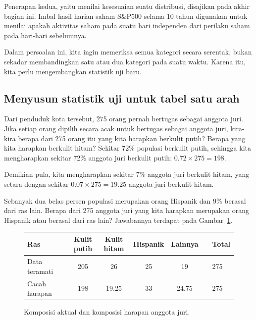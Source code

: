 Penerapan kedua, yaitu menilai kesesuaian suatu distribusi, disajikan pada akhir bagian ini. Imbal hasil harian saham S\&P500 selama 10 tahun digunakan untuk menilai apakah aktivitas saham pada suatu hari independen dari perilaku saham pada hari-hari sebelumnya.

Dalam persoalan ini, kita ingin memeriksa semua kategori secara serentak, bukan sekadar membandingkan satu atau dua kategori pada suatu waktu. Karena itu, kita perlu mengembangkan statistik uji baru.


\subsection{Menyusun statistik uji untuk tabel satu arah}

\begin{examplewrap}
\begin{nexample}{Dari penduduk kota tersebut, 275 orang pernah bertugas sebagai anggota juri. Jika setiap orang dipilih secara acak untuk bertugas sebagai anggota juri, kira-kira berapa dari 275 orang itu yang kita harapkan berkulit putih? Berapa yang kita harapkan berkulit hitam?}
Sekitar 72\% populasi berkulit putih, sehingga kita mengharapkan sekitar 72\% anggota juri berkulit putih: $0.72\times 275 = 198$.

Demikian pula, kita mengharapkan sekitar 7\% anggota juri berkulit hitam, yang setara dengan sekitar $0.07\times 275 = 19.25$ anggota juri berkulit hitam.
\end{nexample}
\end{examplewrap}

\begin{exercisewrap}
\begin{nexercise}
Sebanyak dua belas persen populasi merupakan orang Hispanik dan 9\% berasal dari ras lain. Berapa dari 275 anggota juri yang kita harapkan merupakan orang Hispanik atau berasal dari ras lain? Jawabannya terdapat pada Gambar~\ref{expectedJuryRepresentationIfNoBias}.
\end{nexercise}
\end{exercisewrap}

\begin{figure}[h]
\centering
\begin{tabular}{ll ccc c ll}
\hline
Ras	 & \hspace{2mm} & Kulit putih & Kulit hitam & Hispanik & Lainnya & \hspace{2mm} & Total \\
\hline
Data teramati			&	& 205 & 26	& 25 & 19	&	& 275 \\
Cacah harapan	 &	& 198 & 19.25 & 33 & 24.75 & & 275 \\
\hline
\end{tabular}
\caption{Komposisi aktual dan komposisi harapan anggota juri.}
\label{expectedJuryRepresentationIfNoBias}
\end{figure}


